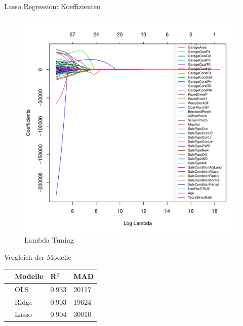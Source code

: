 \documentclass[10pt]{beamer}
\begin{document}
\begin{frame}{Lasso Regression: Koeffizienten}
	
	\begin{figure}
		\centering
		\includegraphics[height=.7\textheight]{figures/lasso_coeff.pdf}
		\caption{Lambda Tuning}
	\end{figure}
	
\end{frame}



\begin{frame}{Vergleich der Modelle}
\begin{table}[ht]
\centering
\begin{tabular}{rlll}
  \hline
 & Modelle & R$^2$ & MAD \\ 
  \hline
   & OLS & 0.933 & 20117 \\ 
   & Ridge & 0.903 & 19624 \\ 
   & Lasso & 0.904 & 30010\\ 
   \hline
\end{tabular}
\end{table}

\end{frame}
\end{document}
